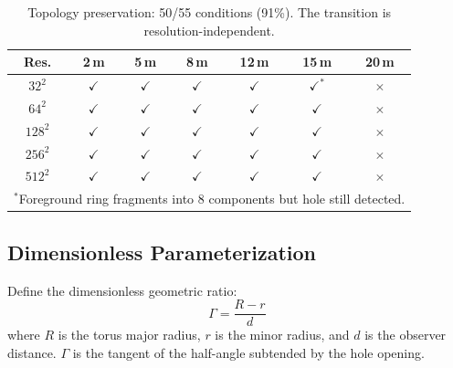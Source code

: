 \documentclass[11pt,a4paper]{article}
\theoremstyle{remark}
\begin{document}
\begin{table}[H]
\centering
\caption{Topology preservation: 50/55 conditions (91\%). The transition is resolution-independent.}
\label{tab:results}
\begin{tabular}{c|cccccc}
\toprule
\textbf{Res.} & \textbf{2\,m} & \textbf{5\,m} & \textbf{8\,m} & \textbf{12\,m} & \textbf{15\,m} & \textbf{20\,m} \\
\midrule
$32^2$   & $\checkmark$ & $\checkmark$ & $\checkmark$ & $\checkmark$ & $\checkmark^*$ & $\times$ \\
$64^2$   & $\checkmark$ & $\checkmark$ & $\checkmark$ & $\checkmark$ & $\checkmark$ & $\times$ \\
$128^2$  & $\checkmark$ & $\checkmark$ & $\checkmark$ & $\checkmark$ & $\checkmark$ & $\times$ \\
$256^2$  & $\checkmark$ & $\checkmark$ & $\checkmark$ & $\checkmark$ & $\checkmark$ & $\times$ \\
$512^2$  & $\checkmark$ & $\checkmark$ & $\checkmark$ & $\checkmark$ & $\checkmark$ & $\times$ \\
\bottomrule
\multicolumn{7}{l}{\footnotesize $^*$Foreground ring fragments into 8 components but hole still detected.}
\end{tabular}
\end{table}

\subsection{Dimensionless Parameterization}

Define the dimensionless geometric ratio:
\begin{equation}
    \Gamma = \frac{R - r}{d}
    \label{eq:gamma}
\end{equation}
where $R$ is the torus major radius, $r$ is the minor radius, and $d$ is the observer distance. $\Gamma$ is the tangent of the half-angle subtended by the hole opening.
\end{document}

